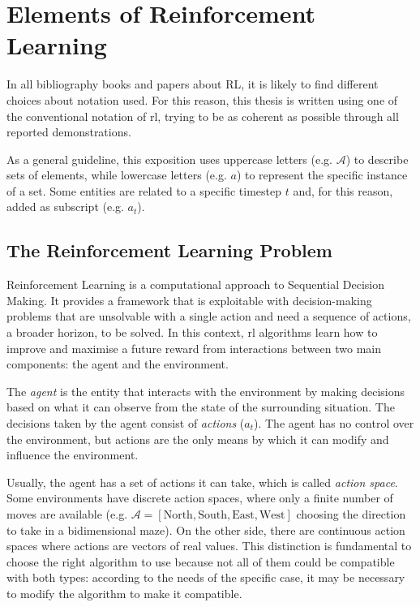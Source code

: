 \section{Elements of Reinforcement Learning}

In all bibliography books and papers about RL, it is likely to find different choices about notation used. For this reason, this thesis is written using one of the conventional notation of \acrshort{rl}, trying to be as coherent as possible through all reported demonstrations.

As a general guideline, this exposition uses uppercase letters (e.g. $\mathcal{A}$) to describe sets of elements, while lowercase letters (e.g. $a$) to represent the specific instance of a set. Some entities are related to a specific timestep $t$ and, for this reason, added as subscript (e.g. $a_t$).

\subsection{The Reinforcement Learning Problem}

Reinforcement Learning is a computational approach to Sequential Decision Making. It provides a framework that is exploitable with decision-making problems that are unsolvable with a single action and need a sequence of actions, a broader horizon, to be solved. In this context, \acrshort{rl} algorithms learn how to improve and maximise a future reward from interactions between two main components: the agent and the environment. 

The \textit{agent} is the entity that interacts with the environment by making decisions based on what it can observe from the state of the surrounding situation. The decisions taken by the agent consist of \textit{actions} ($a_t$).  The agent has no control over the environment, but actions are the only means by which it can modify and influence the environment.

Usually, the agent has a set of actions it can take, which is called \textit{action space}.
Some environments have discrete action spaces, where only a finite number of moves are available (e.g. $\mathcal{A} = [\text{North}, \text{South}, \text{East}, \text{West}]$ choosing the direction to take in a bidimensional maze). On the other side, there are continuous action spaces where actions are vectors of real values.
This distinction is fundamental to choose the right algorithm to use because not all of them could be compatible with both types: according to the needs of the specific case, it may be necessary to modify the algorithm to make it compatible.

